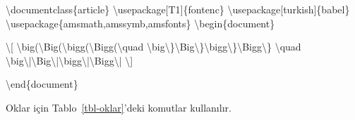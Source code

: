 \documentclass[
  letterpaper,
  DIV=11,
  numbers=noendperiod]{scrreprt}
\newenvironment{Shaded}{\begin{snugshade}}{\end{snugshade}}
\newcommand{\BuiltInTok}[1]{\textcolor[rgb]{0.00,0.23,0.31}{#1}}
\newcommand{\ExtensionTok}[1]{\textcolor[rgb]{0.00,0.23,0.31}{#1}}
\newcommand{\KeywordTok}[1]{\textcolor[rgb]{0.00,0.23,0.31}{#1}}
\newcommand{\NormalTok}[1]{\textcolor[rgb]{0.00,0.23,0.31}{#1}}
\newcommand{\SpecialCharTok}[1]{\textcolor[rgb]{0.37,0.37,0.37}{#1}}
\newcommand{\SpecialStringTok}[1]{\textcolor[rgb]{0.13,0.47,0.30}{#1}}
\begin{document}
\begin{Shaded}
\begin{Highlighting}[]
\BuiltInTok{\textbackslash{}documentclass}\NormalTok{\{}\ExtensionTok{article}\NormalTok{\}}
\BuiltInTok{\textbackslash{}usepackage}\NormalTok{[T1]\{}\ExtensionTok{fontenc}\NormalTok{\}}
\BuiltInTok{\textbackslash{}usepackage}\NormalTok{[turkish]\{}\ExtensionTok{babel}\NormalTok{\}}
\BuiltInTok{\textbackslash{}usepackage}\NormalTok{\{}\ExtensionTok{amsmath,amssymb,amsfonts}\NormalTok{\}}
\KeywordTok{\textbackslash{}begin}\NormalTok{\{}\ExtensionTok{document}\NormalTok{\}}

\SpecialStringTok{\textbackslash{}[}
\SpecialCharTok{\textbackslash{}big}\SpecialStringTok{(}\SpecialCharTok{\textbackslash{}Big}\SpecialStringTok{(}\SpecialCharTok{\textbackslash{}bigg}\SpecialStringTok{(}\SpecialCharTok{\textbackslash{}Bigg}\SpecialStringTok{(}\SpecialCharTok{\textbackslash{}quad}
\SpecialCharTok{\textbackslash{}big\textbackslash{}\}\textbackslash{}Big\textbackslash{}\}\textbackslash{}bigg\textbackslash{}\}\textbackslash{}Bigg\textbackslash{}\}}
\SpecialCharTok{\textbackslash{}quad}
\SpecialCharTok{\textbackslash{}big\textbackslash{}|\textbackslash{}Big\textbackslash{}|\textbackslash{}bigg\textbackslash{}|\textbackslash{}Bigg\textbackslash{}|}
\SpecialStringTok{\textbackslash{}]}

\KeywordTok{\textbackslash{}end}\NormalTok{\{}\ExtensionTok{document}\NormalTok{\}}
\end{Highlighting}
\end{Shaded}

Oklar için Tablo~\ref{tbl-oklar}'deki komutlar kullanılır.
\end{document}
